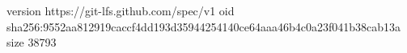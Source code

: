 version https://git-lfs.github.com/spec/v1
oid sha256:9552aa812919caccf4dd193d35944254140ce64aaa46b4c0a23f041b38cab13a
size 38793
